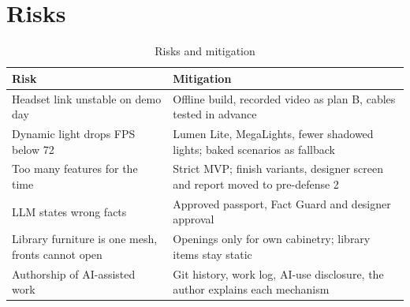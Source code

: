 \section{Risks}

\begin{table}[H]
\centering
\begin{tightblock}
\begin{tabularx}{\textwidth}{P{5.0cm} L}
\toprule
\textbf{Risk} & \textbf{Mitigation} \\
\midrule
Headset link unstable on demo day & Offline build, recorded video as plan B, cables tested in advance \\
Dynamic light drops FPS below 72 & Lumen Lite, MegaLights, fewer shadowed lights; baked scenarios as fallback \\
Too many features for the time & Strict MVP; finish variants, designer screen and report moved to pre-defense 2 \\
LLM states wrong facts & Approved passport, Fact Guard and designer approval \\
Library furniture is one mesh, fronts cannot open & Openings only for own cabinetry; library items stay static \\
Authorship of AI-assisted work & Git history, work log, AI-use disclosure, the author explains each mechanism \\
\bottomrule
\end{tabularx}
\end{tightblock}
\caption{Risks and mitigation}
\label{tab:risks}
\end{table}
